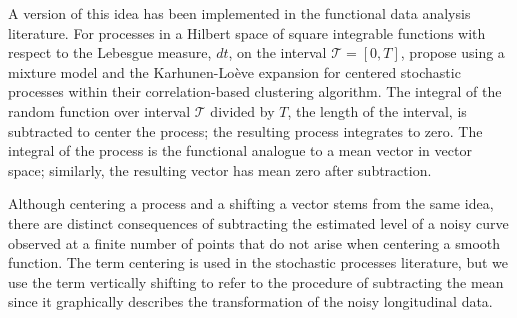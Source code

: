 \documentclass[12pt]{article}
\begin{document}
A version of this idea has been implemented in the functional data analysis literature. For processes in a Hilbert space of square integrable functions with respect to the Lebesgue measure, $dt$, on the interval $\mathcal{T}=[0,T]$, \textcite{chiou2008} propose using a mixture model and the Karhunen-Lo{\`e}ve expansion for centered stochastic processes within their correlation-based clustering algorithm. The integral of the random function over interval $\mathcal{T}$ divided by $T$, the length of the interval, is subtracted to center the process; the resulting process integrates to zero. The integral of the process is the functional analogue to a mean vector in vector space; similarly, the resulting vector has mean zero after subtraction.

 Although centering a process and a shifting a vector stems from the same idea, there are distinct consequences of subtracting the estimated level of a noisy curve observed at a finite number of points that do not arise when centering a smooth function. The term centering is used in the stochastic processes literature, but we use the term vertically shifting to refer to the procedure of subtracting the mean since it graphically describes the transformation of the noisy longitudinal data.
\end{document}
